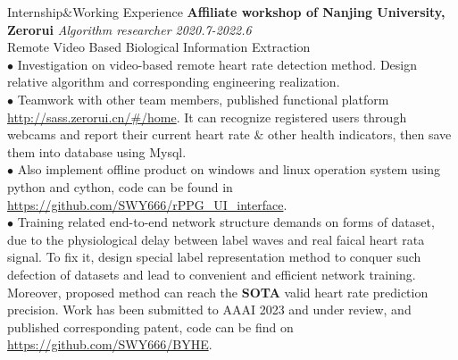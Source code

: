 \documentclass{resume} %
\begin{document}
\begin{rSection}{Internship$\&$Working Experience}
    {\bf Affiliate workshop of Nanjing University, Zerorui} \hfill {\em Algorithm researcher 2020.7-2022.6} \\
    Remote Video Based Biological Information Extraction \\
    {$\bullet$ Investigation on video-based remote heart rate detection method. Design relative algorithm and corresponding engineering realization. \\
    $\bullet$ Teamwork with other team members, published functional platform \url{http://sass.zerorui.cn/#/home}. It can recognize registered users through webcams and report their current heart rate $\&$ other health indicators, then save them into database using Mysql. \\
    $\bullet$ Also implement offline product on windows and linux operation system using python and cython, code can be found in \url{https://github.com/SWY666/rPPG_UI_interface}. \\
    $\bullet$ Training related end-to-end network structure demands on forms of dataset, due to the physiological delay between label waves and real faical heart rata signal. To fix it, design special label representation method to conquer such defection of datasets and lead to convenient and efficient network training. Moreover, proposed method can reach the \textbf{SOTA} valid heart rate prediction precision. Work has been submitted to AAAI 2023 and under review, and published corresponding patent, code can be find on \url{https://github.com/SWY666/BYHE}.}
\end{rSection}
\end{document}
